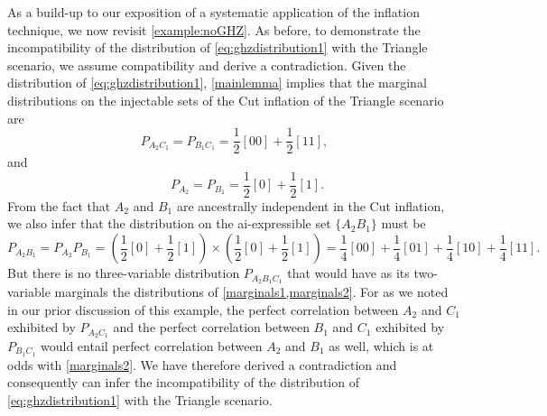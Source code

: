 \documentclass[aps,english,10pt,superscriptaddress,onecolumn,twoside,longbibliography,pra,floatfix,fleqn,nofootinbib]{revtex4-1}%
\theoremstyle{definition}
\newcounter{example}[section]
\begin{document}
As a build-up to our exposition of a systematic application of the inflation technique, we now revisit \cref{example:noGHZ}.  As before, to demonstrate the incompatibility of the distribution of \cref{eq:ghzdistribution1} with the Triangle scenario, we assume compatibility and derive a contradiction.  Given the distribution of \cref{eq:ghzdistribution1}, \cref{mainlemma} implies that the marginal distributions on the injectable sets of the Cut inflation of the Triangle scenario are 
\begin{equation}
P_{A_2 C_1} = P_{B_1 C_1} = \frac{1}{2} [00] +\frac{1}{2} [11], 
\label{marginals1}
\end{equation}
and
\begin{equation}
\qquad P_{A_2} = P_{B_1}=\frac{1}{2} [0] +\frac{1}{2} [1].
\label{marginals1prime}
\end{equation}
From the fact that $A_2$ and $B_1$ are ancestrally independent in the Cut inflation, we also infer that the distribution on the ai-expressible set $\{A_2 B_1\}$ must be
\begin{equation}
P_{A_2 B_1} = P_{A_2}P_{B_1} = \left(\frac{1}{2} [0] +\frac{1}{2} [1]\right)\times\left(\frac{1}{2} [0] +\frac{1}{2} [1]\right)=\frac{1}{4} [00]+\frac{1}{4} [01]+\frac{1}{4} [10]+\frac{1}{4} [11].
\label{marginals2}
\end{equation}
But there is no three-variable distribution $P_{A_2 B_1 C_1}$ that would have as its two-variable marginals the distributions of \cref{marginals1,marginals2}. For as we noted in our prior discussion of this example, the perfect correlation between $A_2$ and $C_1$ exhibited by $P_{A_2 C_1}$ and the perfect correlation between $B_1$ and $C_1$ exhibited by $P_{B_1 C_1}$ would entail perfect correlation between $A_2$ and $B_1$ as well, which is at odds with \eqref{marginals2}. 
We have therefore derived a contradiction and consequently can infer the incompatibility of the distribution of \cref{eq:ghzdistribution1} with the Triangle scenario.
\end{document}
